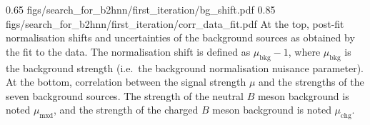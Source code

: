 {0.65}
{figs/search_for_b2hnn/first_iteration/bg_shift.pdf}
{0.85}
{figs/search_for_b2hnn/first_iteration/corr_data_fit.pdf}
{
At the top, post-fit normalisation shifts and uncertainties of the background sources as obtained by the \sghf fit to the data.
The normalisation shift is defined as $\mu_{\mathrm{bkg}}-1$, where $\mu_{\mathrm{bkg}}$ is the background strength (i.e.~the background normalisation nuisance parameter).
At the bottom, correlation between the signal strength $\mu$ and the strengths of the seven background sources.
The strength of the neutral $B$ meson background is noted $\mu_{\mathrm{mxd}}$, and the strength of the charged $B$ meson background is noted $\mu_{\mathrm{chg}}$.
}
